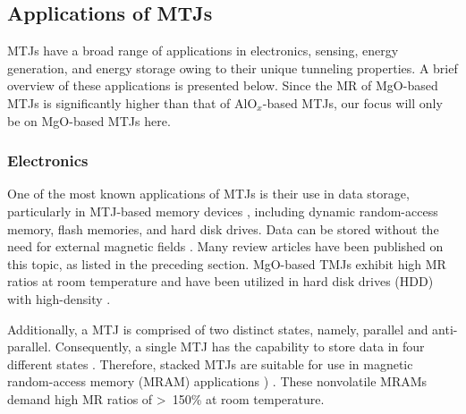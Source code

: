 \documentclass[molecules,review,submit,pdftex,moreauthors]{Definitions/mdpi}
\begin{document}


\subsection{Applications of MTJs}


MTJs have a broad range of applications in electronics, sensing, energy generation, and energy storage owing to their unique tunneling properties.  A brief overview of these applications is presented below.  Since the MR of MgO-based MTJs is significantly higher than that of AlO$_x$-based MTJs, our focus will only be on MgO-based MTJs here.


\vspace{12pt}
\subsubsection{Electronics}


One of the most known applications of MTJs is their use in data storage, particularly in MTJ-based memory devices   \cite{Akerman2005Science,Mao2006IEEE,Chappert2007NM,Puebla2020CM}, including dynamic random-access memory, flash memories,  and hard disk drives.  Data can be stored without the need for external magnetic fields \cite{Hosomi2005IEEE}.  Many review articles have been published on this topic, as listed in the preceding section.  MgO-based TMJs exhibit high MR ratios at room temperature and have been utilized  in hard disk drives (HDD) with high-density  \cite{Ho2001IEEE,Mao2002IEEE,Araki2002IEEE,Mao2004IEEE,Mao2006IEEE,Kagami2006IEEE,Chappert2007NM}.


Additionally, a MTJ is comprised of two distinct states, namely, parallel and anti-parallel.  Consequently, a single MTJ has the capability to store data in four different states \cite{horiguchi2006multi}.  Therefore, stacked MTJs are suitable for use in magnetic random-access memory (MRAM) applications \cite{Yuasa2007JPd}) \cite{Tehrani1999JAP,Parkin1999JAP,Tehrani1999IEEE,Engel2002IEEE,Katti2003IEEE,Tehrani2003IEEE,Yuasa2004NM,Engel2005IEEE,Chappert2007NM,Zhu2008IEEE,Dave2006IEEE,Gallagher2006IBM}.  %
These nonvolatile MRAMs demand high MR ratios of \unit{> 150}{\%} at room temperature.   
\end{document}
